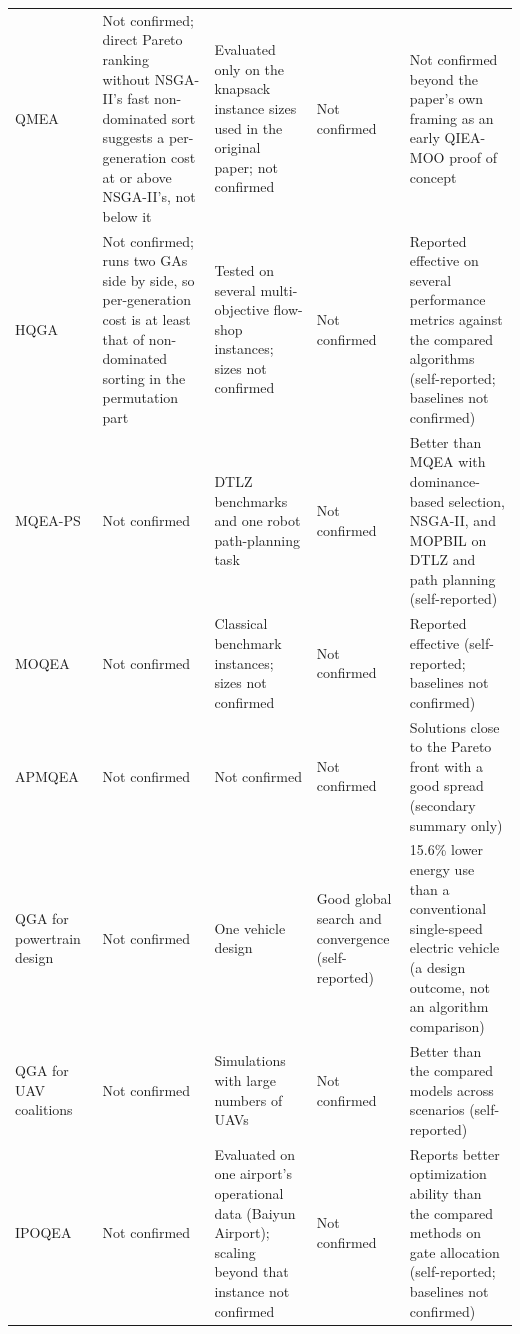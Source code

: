 \begin{xltabular}{\fulllength}{@{}p{2.1cm}XXXX@{}}
    QMEA~\citep{kim2006qmea} &
      Not confirmed; direct Pareto ranking without NSGA-II's fast
      non-dominated sort suggests a per-generation cost at or above
      NSGA-II's, not below it &
      Evaluated only on the knapsack instance sizes used in the
      original paper; not confirmed &
      Not confirmed &
      Not confirmed beyond the paper's own framing as an early
      QIEA-MOO proof of concept \\
    HQGA~\citep{li2007hqga} &
      Not confirmed; runs two GAs side by side, so per-generation cost
      is at least that of non-dominated sorting in the permutation part &
      Tested on several multi-objective flow-shop instances; sizes not
      confirmed &
      Not confirmed &
      Reported effective on several performance metrics against the
      compared algorithms (self-reported; baselines not confirmed) \\
    MQEA-PS~\citep{kim2011mqeaps} &
      Not confirmed &
      DTLZ benchmarks and one robot path-planning task &
      Not confirmed &
      Better than MQEA with dominance-based selection, NSGA-II, and
      MOPBIL on DTLZ and path planning (self-reported) \\
    MOQEA~\citep{zhang2012moqeavrp} &
      Not confirmed &
      Classical benchmark instances; sizes not confirmed &
      Not confirmed &
      Reported effective (self-reported; baselines not confirmed) \\
    APMQEA~\citep{lu2013apmqea} &
      Not confirmed &
      Not confirmed &
      Not confirmed &
      Solutions close to the Pareto front with a good spread (secondary
      summary only) \\
    QGA for powertrain design~\citep{wang2014powertrain} &
      Not confirmed &
      One vehicle design &
      Good global search and convergence (self-reported) &
      15.6\% lower energy use than a conventional single-speed electric
      vehicle (a design outcome, not an algorithm comparison) \\
    QGA for UAV coalitions~\citep{mousavi2019uav} &
      Not confirmed &
      Simulations with large numbers of UAVs &
      Not confirmed &
      Better than the compared models across scenarios (self-reported) \\
    IPOQEA~\citep{deng2020gate} &
      Not confirmed &
      Evaluated on one airport's operational data (Baiyun Airport);
      scaling beyond that instance not confirmed &
      Not confirmed &
      Reports better optimization ability than the compared methods on
      gate allocation (self-reported; baselines not confirmed) \\

\end{xltabular}
